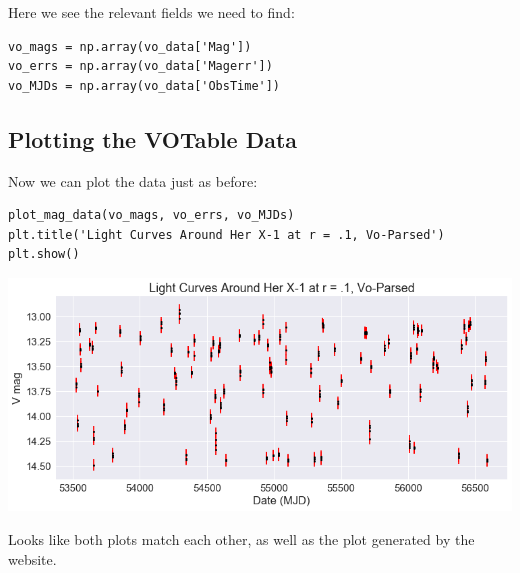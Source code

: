 \documentclass[11pt]{article}
\begin{document}
Here we see the relevant fields we need to find:

\begin{verbatim}
vo_mags = np.array(vo_data['Mag'])
vo_errs = np.array(vo_data['Magerr'])
vo_MJDs = np.array(vo_data['ObsTime'])
\end{verbatim}

\subsection*{Plotting the VOTable Data}
\label{sec-5-1}

Now we can plot the data just as before:

\begin{verbatim}
plot_mag_data(vo_mags, vo_errs, vo_MJDs)
plt.title('Light Curves Around Her X-1 at r = .1, Vo-Parsed')
plt.show()
\end{verbatim}

\includegraphics[width=.9\linewidth]{./obipy-resources/17087XX1.png}



Looks like both plots match each other, as well as the plot generated by the website.
\end{document}
